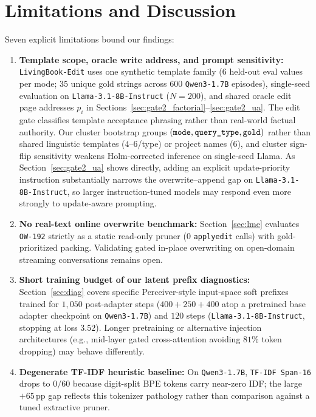 \documentclass[10pt]{article}
\newcommand{\pp}{\,\text{pp}}
\renewcommand{\_}{\origunderscore\allowbreak}
\begin{document}
\section{Limitations and Discussion}
\label{sec:limitations}

Seven explicit limitations bound our findings:
\begin{enumerate}
    \item \textbf{Template scope, oracle write address, and prompt sensitivity:} \texttt{LivingBook-Edit} uses one synthetic template family ($6$ held-out eval values per mode; $35$ unique gold strings across $600$ \texttt{Qwen3-1.7B} episodes), single-seed evaluation on \texttt{Llama-3.1-8B-Instruct} ($N=200$), and shared oracle edit page addresses $p_i$ in Sections~\ref{sec:gate2_factorial}--\ref{sec:gate2_ua}. The edit gate classifies template acceptance phrasing rather than real-world factual authority. Our cluster bootstrap groups $( \texttt{mode}, \texttt{query\_type}, \texttt{gold} )$ rather than shared linguistic templates ($4$--$6$/type) or project names ($6$), and cluster sign-flip sensitivity weakens Holm-corrected inference on single-seed Llama. As Section~\ref{sec:gate2_ua} shows directly, adding an explicit update-priority instruction substantially narrows the overwrite--append gap on \texttt{Llama-3.1-8B-Instruct}, so larger instruction-tuned models may respond even more strongly to update-aware prompting.
    \item \textbf{No real-text online overwrite benchmark:} Section~\ref{sec:lme} evaluates \texttt{OW-192} strictly as a static read-only pruner ($0$ \texttt{apply\_edit} calls) with gold-prioritized packing. Validating gated in-place overwriting on open-domain streaming conversations remains open.
    \item \textbf{Short training budget of our latent prefix diagnostics:} Section~\ref{sec:diag} covers specific Perceiver-style input-space soft prefixes trained for $1{,}050$ post-adapter steps ($400+250+400$ atop a pretrained base adapter checkpoint on \texttt{Qwen3-1.7B}) and $120$ steps (\texttt{Llama-3.1-8B-Instruct}, stopping at loss $3.52$). Longer pretraining or alternative injection architectures (e.g., mid-layer gated cross-attention avoiding $81\%$ token dropping) may behave differently.
    \item \textbf{Degenerate TF-IDF heuristic baseline:} On \texttt{Qwen3-1.7B}, \texttt{TF-IDF Span-16} drops to $0/60$ because digit-split BPE tokens carry near-zero IDF; the large $+65\pp$ gap reflects this tokenizer pathology rather than comparison against a tuned extractive pruner.

\end{enumerate}
\end{document}
